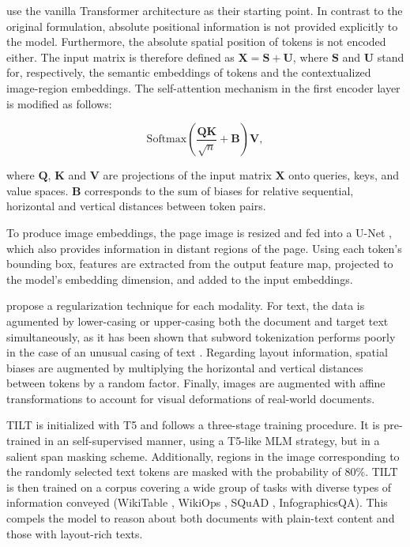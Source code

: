 \citet{powalski2021going} use the vanilla Transformer architecture as their starting point. In contrast to the original formulation, absolute positional information is not provided explicitly to the model. Furthermore, the absolute spatial position of tokens is not encoded either. The input matrix is therefore defined as $\bm{X} = \bm{S} + \bm{U}$, where $\bm{S}$ and $\bm{U}$ stand for, respectively, the semantic embeddings of tokens and the contextualized image-region embeddings. The self-attention mechanism in the first encoder layer is modified as follows:

\begin{equation}
    \text{Softmax}\left(\dfrac{\bm{Q}\bm{K}}{\sqrt{n}} + \bm{B}\right) \bm{V},
\end{equation}

\noindent where $\bm{Q}$, $\bm{K}$ and $\bm{V}$ are projections of the input matrix $\bm{X}$ onto queries, keys, and value spaces. $\bm{B}$ corresponds to the sum of biases for relative sequential, horizontal and vertical distances between token pairs.

To produce image embeddings, the page image is resized and fed into a U-Net \citep{ronneberger2015u}, which also provides information in distant regions of the page. Using each token's bounding box, features are extracted from the output feature map, projected to the model's embedding dimension, and added to the input embeddings.

\citet{powalski2021going} propose a regularization technique for each modality. For text, the data is agumented by lower-casing or upper-casing both the document and target text simultaneously, as it has been shown that subword tokenization performs poorly in the case of an unusual casing of text \citep{powalski2020unicase}. Regarding layout information, spatial biases are augmented by multiplying the horizontal and vertical distances between tokens by a random factor. Finally, images are augmented with affine transformations to account for visual deformations of real-world documents. 

TILT is initialized with \ac{T5} and follows a three-stage training procedure. It is pre-trained in an self-supervised manner, using a T5-like \ac{MLM} strategy, but in a salient span masking scheme. Additionally, regions in the image corresponding to the randomly selected text tokens are masked with the probability of 80\%. TILT is then trained on a corpus covering a wide group of tasks with diverse types of information conveyed (WikiTable \citep{cho2018adversarial}, WikiOps \citep{pasupat2015compositional}, SQuAD \citep{rajpurkar2016squad}, InfographicsQA). This compels the model to reason about both documents with plain-text content and those with layout-rich texts.


